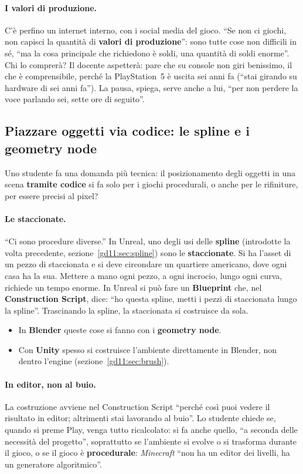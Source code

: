 \paragraph{I valori di produzione.} C'è perfino un internet interno, con i social
media del gioco. ``Se non ci giochi, non capisci la quantità di \textbf{valori di
produzione}'': sono tutte cose non difficili in sé, ``ma la cosa principale che
richiedono è soldi, una quantità di soldi enorme''. Chi lo comprerà? Il docente
aspetterà: pare che su console non giri benissimo, il che è comprensibile, perché
la PlayStation~5 è uscita sei anni fa (``stai girando su hardware di sei anni
fa''). La pausa, spiega, serve anche a lui, ``per non perdere la voce parlando sei,
sette ore di seguito''.

\subsection{Piazzare oggetti via codice: le spline e i geometry node}

Uno studente fa una domanda più tecnica: il posizionamento degli oggetti in una
scena \textbf{tramite codice} si fa solo per i giochi procedurali, o anche per le
rifiniture, per essere precisi al pixel?

\paragraph{Le staccionate.} ``Ci sono procedure diverse.'' In Unreal, uno degli usi
delle \textbf{spline} (introdotte la volta precedente,
sezione~\ref{gd11:sec:spline}) sono le \textbf{staccionate}. Si ha l'asset di un
pezzo di staccionata e si deve circondare un quartiere americano, dove ogni casa
ha la sua. Mettere a mano ogni pezzo, a ogni incrocio, lungo ogni curva, richiede
un tempo enorme. In Unreal si può fare un \textbf{Blueprint} che, nel
\textbf{Construction Script}, dice: ``ho questa spline, metti i pezzi di staccionata
lungo la spline''. Trascinando la spline, la staccionata si costruisce da sola.
\begin{itemize}
  \item In \textbf{Blender} queste cose si fanno con i \textbf{geometry node}.
  \item Con \textbf{Unity} spesso si costruisce l'ambiente direttamente in Blender,
        non dentro l'engine (sezione~\ref{gd11:sec:brush}).
\end{itemize}

\paragraph{In editor, non al buio.} La costruzione avviene nel Construction Script
``perché così puoi vedere il risultato in editor; altrimenti stai lavorando al
buio''. Lo studente chiede se, quando si preme Play, venga tutto ricalcolato: si
fa anche quello, ``a seconda delle necessità del progetto'', soprattutto se
l'ambiente si evolve o si trasforma durante il gioco, o se il gioco è
\textbf{procedurale}: \emph{Minecraft} ``non ha un editor dei livelli, ha un
generatore algoritmico''.

